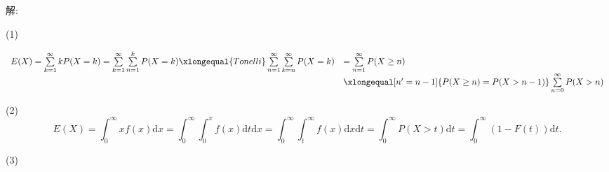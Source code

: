 \documentclass[standard]{ExBook}
\begin{document}
\begin{qitems}
\vspace{-5em}

    \begin{bbox}
解: 

(1)
\vspace{-2em}
\begin{center}
\begin{equation}
\begin{array}{ll}
    \nonumber
    E(X)=\sum\limits_{k=1}^{\infty}k P(X=k)=\sum\limits_{k=1}^{\infty}\sum\limits_{n=1}^{k}P(X=k)\xlongequal{Tonelli}\sum\limits_{n=1}^{\infty}\sum\limits_{k=n}^{\infty}P(X=k) & =\sum\limits_{n=1}^{\infty}P(X\geq n)\\
     & \xlongequal[n'=n-1]{P(X\geq n)=P(X>n-1)}\sum\limits_{n=0}^{\infty}P(X>n)
\end{array}
\end{equation}
\end{center}
(2)
$$E(X)=\displaystyle\int_{0}^{\infty}xf(x)\mathrm{d}x=\int_{0}^{\infty}\int_{0}^{x}f(x)\mathrm{d}t\mathrm{d}x=\int_{0}^{\infty}\int_{t}^{\infty}f(x)\mathrm{d}x\mathrm{d}t=\int_{0}^{\infty}P(X>t)\mathrm{d}t=\int_{0}^{\infty}(1-F(t))\mathrm{d}t.$$
    \end{bbox}

\vspace{-5em}

    \begin{bbox}
(3)


\end{bbox}
\end{qitems}
\end{document}
